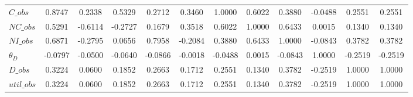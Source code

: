 \begin{center}
\begin{longtable}{lccccccccccc}
$C\_obs      $	 & 	        0.8747	 & 	        0.2338	 & 	        0.5329	 & 	        0.2712	 & 	        0.3460	 & 	        1.0000	 & 	        0.6022	 & 	        0.3880	 & 	       -0.0488	 & 	        0.2551	 & 	        0.2551 \\ 
$NC\_obs     $	 & 	        0.5291	 & 	       -0.6114	 & 	       -0.2727	 & 	        0.1679	 & 	        0.3518	 & 	        0.6022	 & 	        1.0000	 & 	        0.6433	 & 	        0.0015	 & 	        0.1340	 & 	        0.1340 \\ 
$NI\_obs     $	 & 	        0.6871	 & 	       -0.2795	 & 	        0.0656	 & 	        0.7958	 & 	       -0.2084	 & 	        0.3880	 & 	        0.6433	 & 	        1.0000	 & 	       -0.0843	 & 	        0.3782	 & 	        0.3782 \\ 
${\theta_D}  $	 & 	       -0.0797	 & 	       -0.0500	 & 	       -0.0640	 & 	       -0.0866	 & 	       -0.0018	 & 	       -0.0488	 & 	        0.0015	 & 	       -0.0843	 & 	        1.0000	 & 	       -0.2519	 & 	       -0.2519 \\ 
$D\_obs      $	 & 	        0.3224	 & 	        0.0600	 & 	        0.1852	 & 	        0.2663	 & 	        0.1712	 & 	        0.2551	 & 	        0.1340	 & 	        0.3782	 & 	       -0.2519	 & 	        1.0000	 & 	        1.0000 \\ 
$util\_obs   $	 & 	        0.3224	 & 	        0.0600	 & 	        0.1852	 & 	        0.2663	 & 	        0.1712	 & 	        0.2551	 & 	        0.1340	 & 	        0.3782	 & 	       -0.2519	 & 	        1.0000	 & 	        1.0000 \\ 
\end{longtable}
 \end{center}
